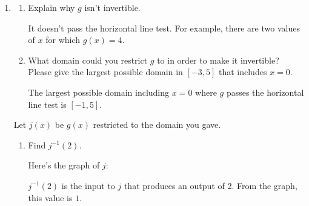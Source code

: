 \documentclass{article}
\renewcommand{\answer}[1]{#1}
\theoremstyle{theorem}
\begin{document}
\begin{enumerate}
\begin{enumerate}
  \item %

    \begin{enumerate}
    \item
      \begin{problem}[\vfill]
        Explain why $g$ isn't invertible. 
      \end{problem}

      \begin{solution}
        \answer{It doesn't pass the horizontal line test. For example, there are two values of $x$ for which $g(x) = 4$.}
      \end{solution}

    \item
      \begin{problem}[\vfill]
        What domain could you restrict $g$ to in order to make it invertible? Please give the largest possible domain in $[-3, 5]$ that includes $x = 0$. 
      \end{problem}

      \begin{solution}
        The largest possible domain including $x = 0$ where $g$ passes the horizontal line test is $\boxed{[-1, 5]}$. 
      \end{solution}

    \end{enumerate}
    Let $j(x)$ be $g(x)$ restricted to the domain you gave. 
    \begin{enumerate}[resume]
    \item
      \begin{problem}[\stretch{0.75}]
        Find $j^{-1}(2)$.         
      \end{problem}

      \begin{solution}
        Here's the graph of $j$:
        \begin{center}
        \end{center}
        $j^{-1}(2)$ is the input to $j$ that produces an output of 2. From the graph, this value is $\boxed{1}$. 
      \end{solution}


\end{enumerate}
\end{enumerate}
\end{enumerate}
\end{document}
